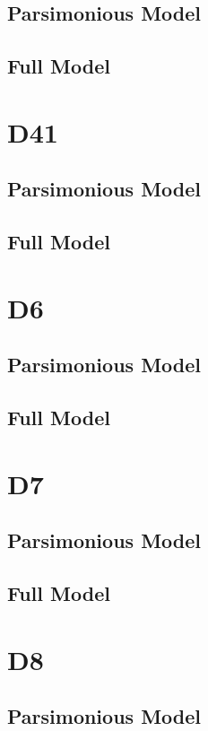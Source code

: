 \documentclass[12pt]{amsart}
\begin{document}
\subsection{Parsimonious Model}

\subsection{Full Model}

\section{D41}
\subsection{Parsimonious Model}

\subsection{Full Model}

\section{D6}
\subsection{Parsimonious Model}

\subsection{Full Model}

\section{D7}
\subsection{Parsimonious Model}

\subsection{Full Model}

\section{D8}
\subsection{Parsimonious Model}
\end{document}
